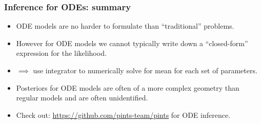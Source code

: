 \documentclass[handout]{beamer}
\begin{document}
\begin{frame}
	\frametitle{Inference for ODEs: summary}
	\begin{itemize}
		\item<2-> ODE models are no harder to formulate than ``traditional'' problems.
		\item<3-> However for ODE models we cannot typically write down a ``closed-form'' expression for the likelihood.
		\item<4-> $\implies$ use integrator to numerically solve for mean for each set of parameters.
		\item<5-> Posteriors for ODE models are often of a more complex geometry than regular models and are often unidentified.
		\item<6-> Check out: \url{https://github.com/pints-team/pints} for ODE inference.
	\end{itemize}
	
\end{frame}
\end{document}
